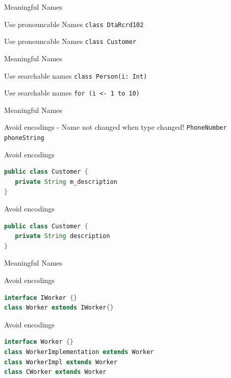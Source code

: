 \begin{frame}[fragile]{Meaningful Names}
\begin{alertblock}{Use pronouncable Names}
\lstinline!class DtaRcrd102!
\end{alertblock}
\begin{exampleblock}{Use pronouncable Names}
\lstinline!class Customer!
\end{exampleblock}
\end{frame}

\begin{frame}[fragile]{Meaningful Names}
\begin{alertblock}{Use searchable names}
\lstinline!class Person(i: Int)!
\end{alertblock}
\begin{exampleblock}{Use searchable names}
\lstinline!for (i <- 1 to 10)!
\end{exampleblock}
\end{frame}

\begin{frame}[fragile]{Meaningful Names}
\begin{alertblock}{Avoid encodings - Name not changed when type changed!}
\lstinline!PhoneNumber phoneString!
\end{alertblock}
\begin{alertblock}{Avoid encodings}
\begin{lstlisting}[language=java]
public class Customer {
   private String m_description
}
\end{lstlisting}
\end{alertblock}
\begin{exampleblock}{Avoid encodings}
\begin{lstlisting}[language=java]
public class Customer {
   private String description
}
\end{lstlisting}
\end{exampleblock}
\end{frame}

\begin{frame}[fragile]{Meaningful Names}
\begin{alertblock}{Avoid encodings}
\begin{lstlisting}[language=Java]
interface IWorker {}
class Worker extends IWorker{} 
\end{lstlisting}
\end{alertblock}
\begin{exampleblock}{Avoid encodings}
\begin{lstlisting}[language=java]
interface Worker {}
class WorkerImplementation extends Worker
class WorkerImpl extends Worker
class CWorker extends Worker
\end{lstlisting}
\end{exampleblock}
\end{frame}

